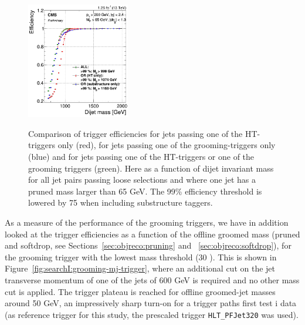 \begin{figure}[htb]
\centering
\includegraphics[width=0.4\textwidth]{figures/analysis/search1/AN-15-211/triggereffMjj-ALL.png}\\
\caption{Comparison of trigger efficiencies for jets passing one of the HT-triggers only (red), for jets passing one of the grooming-triggers only (blue) and for jets passing one of the HT-triggers or one of the grooming triggers (green). Here as a function of dijet invariant mass for all jet pairs passing loose selections and where one jet has a pruned mass larger than 65 GeV. The 99\% efficiency threshold is lowered by 75 \GeV when including substructure taggers. }
\label{fig:searchI:trigger-fits}
\end{figure}

As a measure of the performance of the grooming triggers, we have in addition looked at the trigger efficiencies as a function of the offline groomed mass (pruned and softdrop, see Sections~\ref{sec:objreco:pruning} and ~\ref{sec:objreco:softdrop}), for the grooming trigger with the lowest mass threshold (30 \GeV). This is shown in Figure~\ref{fig:searchI:grooming-mj-trigger}, where an additional cut on the jet transverse momentum of one of the jets of 600 GeV is required and no other mass cut is applied. The trigger plateau is reached for offline groomed-jet masses around 50 GeV, an impressively sharp turn-on for a trigger paths first test i data (as reference trigger for this study, the prescaled trigger \texttt{HLT\_PFJet320} was used). 

